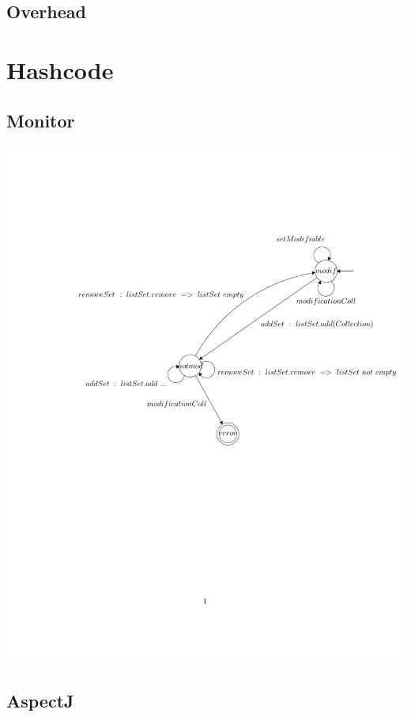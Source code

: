 \documentclass{article}
\begin{document}
\subsection{Overhead}

\section{Hashcode}

\subsection{Monitor}

\begin{center}
\includegraphics[width=16cm, clip, trim=3.5cm 11.5cm 0cm
4.5cm]{hashcode.pdf}
\end{center}

\subsection{AspectJ}
\end{document}
